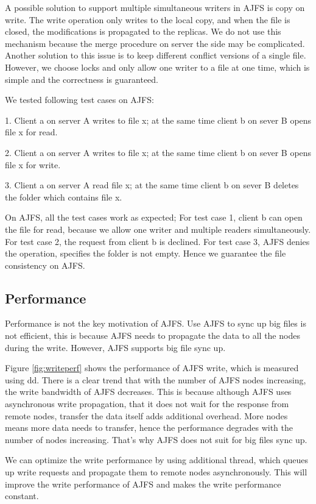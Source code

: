 A possible solution to support multiple simultaneous writers in AJFS is copy on write. The write operation only writes to the local copy, and when the file is closed, the modifications is propagated to the replicas. We do not use this mechanism because the merge procedure on server the side may be complicated. Another solution to this issue is to keep different conflict versions of a single file. 
However, we choose locks and only allow one writer to a file at one time, which is simple and the correctness is guaranteed.

We tested following test cases on AJFS:

1. Client a on server A writes to file x; at the same time client b on sever B opens file x for read.

2. Client a on server A writes to file x; at the same time client b on sever B opens file x for write.

3. Client a on server A read file x; at the same time client b on sever B deletes the folder which contains file x.

On AJFS, all the test cases work as expected; For test case 1, client b can open the file for read, because we allow one writer and multiple readers simultaneously. For test case 2, the request from client b is declined. For test case 3, AJFS denies the operation, specifies the folder is not empty. Hence we guarantee the file consistency on AJFS.

\subsection{Performance}

Performance is not the key motivation of AJFS. Use AJFS to sync up big files is not efficient, this is because AJFS needs to propagate the data to all the nodes during the write.
However, AJFS supports big file sync up.

Figure \ref{fig:writeperf} shows the performance of AJFS write, which is measured using dd.
There is a clear trend that with the number of AJFS nodes increasing,
the write bandwidth of AJFS decreases. This is because although AJFS uses asynchronous write propagation, that it does not wait for the response from remote nodes,
transfer the data itself adds additional overhead. 
More nodes means more data needs to transfer, hence the performance degrades with the number of nodes increasing.
That's why AJFS does not suit for big files sync up.

We can optimize the write performance by using additional thread, which queues up write requests and propagate them to remote nodes asynchronously.
This will improve the write performance of AJFS and makes the write performance constant.

